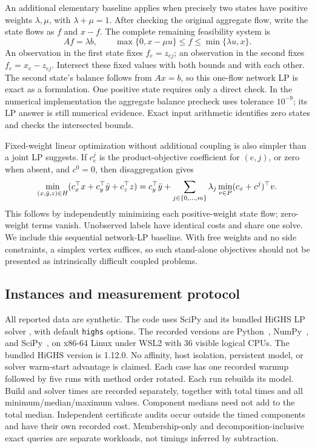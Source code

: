 An additional elementary baseline applies when precisely two states have
positive weights $\lambda,\mu$, with $\lambda+\mu=1$. After checking
the original aggregate flow, write the state flows as $f$ and $x-f$.
The complete remaining feasibility system is
\begin{equation}\label{eq:two-state-membership-lp}
 Af=\lambda b,\qquad
 \max\{0,x-\mu u\}\le f\le\min\{\lambda u,x\}.
\end{equation}
An observation in the first state fixes $f_e=z_{ej}$; an observation
in the second fixes $f_e=x_e-z_{ej}$. Intersect these fixed values
with both bounds and with each other. The second state's balance follows
from $Ax=b$, so this one-flow network LP is exact as a formulation.
One positive state requires only a direct check. In the numerical implementation
the aggregate balance precheck uses tolerance $10^{-9}$; its LP answer is
still numerical evidence. Exact input arithmetic identifies zero states and
checks the intersected bounds.

Fixed-weight linear optimization without additional coupling is also simpler
than a joint LP suggests. If $c^j_e$ is the product-objective coefficient
for $(e,j)$, or zero when absent, and $c^0=0$, then disaggregation gives
\begin{equation}\label{eq:independent-network-objectives}
 \min_{(x,\bar y,z)\in H}
       (c_x^\top x+c_y^\top\bar y+c_z^\top z)
 =c_y^\top\bar y+
   \sum_{j\in\{0,\ldots,m\}}\lambda_j
       \min_{v\in P}(c_x+c^j)^\top v.
\end{equation}
This follows by independently minimizing each positive-weight state flow;
zero-weight terms vanish. Unobserved labels have identical costs and share
one solve. We include this sequential network-LP baseline. With free weights
and no side constraints, a simplex vertex suffices, so such stand-alone
objectives should not be presented as intrinsically difficult coupled problems.

\subsection{Instances and measurement protocol}

All reported data are synthetic. The code uses SciPy
\citep{Virtanen2020} and its bundled HiGHS LP solver
\citep{HuangfuHall2018}, with default \texttt{highs} options.
The recorded versions are Python~\BenchPython, NumPy~\BenchNumpy,
and SciPy~\BenchScipy, on x86-64 Linux under WSL2 with 36 visible
logical CPUs. The bundled HiGHS version is 1.12.0. No affinity, host
isolation, persistent model, or solver warm-start advantage is claimed.
Each case has one recorded warmup followed by five runs with method order
rotated. Each run rebuilds its model. Build and solver times are recorded
separately, together with total times and all minimum/median/maximum values.
Component medians need not add to the total median. Independent certificate
audits occur outside the timed components and have their own recorded cost.
Membership-only and decomposition-inclusive exact queries are separate
workloads, not timings inferred by subtraction.

